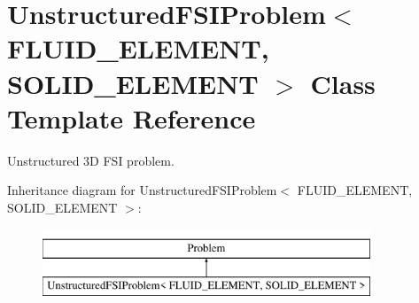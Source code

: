 \hypertarget{classUnstructuredFSIProblem}{}\section{Unstructured\+F\+S\+I\+Problem$<$ F\+L\+U\+I\+D\+\_\+\+E\+L\+E\+M\+E\+NT, S\+O\+L\+I\+D\+\_\+\+E\+L\+E\+M\+E\+NT $>$ Class Template Reference}
\label{classUnstructuredFSIProblem}


Unstructured 3D F\+SI problem.  


Inheritance diagram for Unstructured\+F\+S\+I\+Problem$<$ F\+L\+U\+I\+D\+\_\+\+E\+L\+E\+M\+E\+NT, S\+O\+L\+I\+D\+\_\+\+E\+L\+E\+M\+E\+NT $>$\+:\begin{figure}[H]
\begin{center}
\leavevmode
\includegraphics[height=2.000000cm]{classUnstructuredFSIProblem}
\end{center}
\end{figure}

